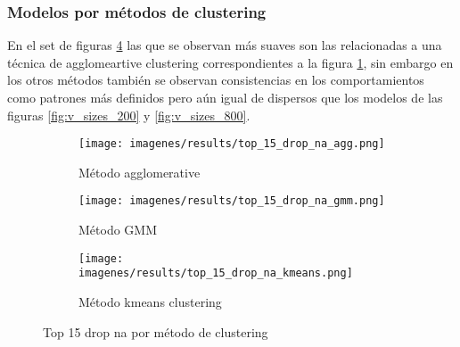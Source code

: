 \documentclass[12pt]{article}
\begin{document}
		\subsubsection{Modelos por métodos de clustering}
		\label{sec:x_metodo_clustering}
		En el set de figuras \ref{fig:by_clustering} las que se observan más suaves son las relacionadas a una técnica de agglomeartive clustering correspondientes a la figura \ref{fig:top_15_drop_na_agg}, sin embargo en los otros métodos también se observan consistencias  en los comportamientos como patrones más definidos pero aún igual de dispersos que los modelos de las figuras  \ref{fig:v_sizes_200} y \ref{fig:v_sizes_800}.
			\begin{figure}[htp]
			\centering\begin{subfigure}[b]{0.5\linewidth} 
				\centering\texttt{[image: imagenes/results/top\_15\_drop\_na\_agg.png]} 
				\caption{\label{fig:top_15_drop_na_agg}Método agglomerative} 
			\end{subfigure}\hfill
			\begin{subfigure}[b]{0.5\linewidth} 
				\centering\texttt{[image: imagenes/results/top\_15\_drop\_na\_gmm.png]} 
				\caption{\label{fig:top_15_drop_na_gmm}Método GMM} 
			\end{subfigure}\vspace{10pt}
			
			\begin{subfigure}[b]{\linewidth} 
				\centering\texttt{[image: imagenes/results/top\_15\_drop\_na\_kmeans.png]} 
				\caption{\label{fig:top_15_drop_na_kmeans}Método kmeans clustering} 
			\end{subfigure} 
			\caption{Top 15 drop na por método de clustering} 
			\label{fig:by_clustering}
			\end{figure}
					
\end{document}
